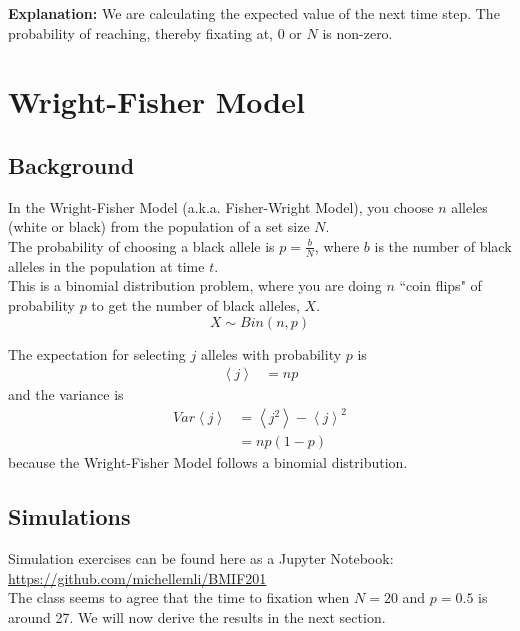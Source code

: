 \documentclass[12pt]{extarticle}
\newcommand{\<}{\langle}
\renewcommand{\>}{\rangle}
\theoremstyle{definition}
\begin{document}
\noindent \textbf{Explanation:} We are calculating the expected value of the next time step. The probability of reaching, thereby fixating at, $0$ or $N$ is non-zero.

\section{Wright-Fisher Model}

\subsection{Background}

In the Wright-Fisher Model (a.k.a. Fisher-Wright Model), you choose $n$ alleles (white or black) from the population of a set size $N$.\\

\noindent The probability of choosing a black allele is $p = \frac{b}{N}$, where $b$ is the number of black alleles in the population at time $t$.\\

\noindent This is a binomial distribution problem, where you are doing $n$ ``coin flips" of probability $p$ to get the number of black alleles, $X$.
\begin{equation}
    X \sim Bin(n, p) \label{bin}
\end{equation}

\noindent The expectation for selecting $j$ alleles with probability $p$ is
\begin{align}
    \left< j \right> &= np
\end{align}
and the variance is
\begin{align}
    Var \left< j \right> &= \left< j^2 \right> - \left< j \right>^2 \label{var1} \\
    &= np(1-p)
\end{align}
because the Wright-Fisher Model follows a binomial distribution.\\

\subsection{Simulations}
Simulation exercises can be found here as a Jupyter Notebook: \url{https://github.com/michellemli/BMIF201}\\

\noindent The class seems to agree that the time to fixation when $N = 20$ and $p = 0.5$ is around 27. We will now derive the results in the next section.\\
\end{document}
